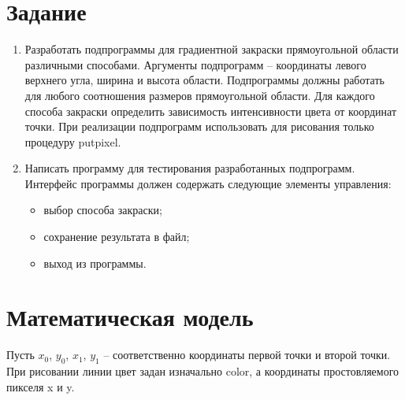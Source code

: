 \documentclass[14pt, a4paper]{extreport}
\begin{document}
\author{Савонин~М.В.}
\maketitle

\chapter{Задание}

\begin{enumerate}

	\item
	Разработать подпрограммы для градиентной закраски прямоугольной области различными способами.
	Аргументы подпрограмм -- координаты левого верхнего угла, ширина и высота области.
	Подпрограммы должны работать для любого соотношения размеров прямоугольной области.
	Для каждого способа закраски определить зависимость интенсивности цвета от координат точки.
	При реализации подпрограмм использовать для рисования только процедуру putpixel.

	\item
	Написать программу для тестирования разработанных \linebreak подпрограмм.
	Интерфейс программы должен содержать следующие элементы управления:
	\begin{itemize}
		\item выбор способа закраски;
		\item сохранение результата в файл;
		\item выход из программы.
	\end{itemize}

\end{enumerate}

\chapter{Математическая модель}

Пусть $x_0$, $y_0$, $x_1$, $y_1$ -- соответственно координаты первой точки и второй точки.
При рисовании линии цвет задан изначально color, а координаты простовляемого пикселя x и y.
\end{document}
